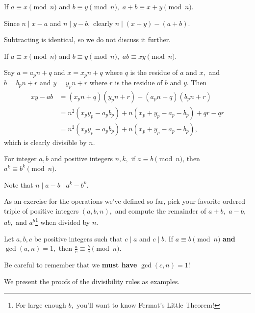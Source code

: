 \documentclass[blue,onecol]{shooting}
\begin{document}
\begin{fact}[Adding]
If $a \equiv x\pmod{n}$ and $b\equiv y\pmod{n},$ $a+b\equiv x+y\pmod{n}.$
\end{fact}

\begin{pro}
Since $n\mid x-a$ and $n\mid y-b,$ clearly $n\mid(x+y)-(a+b).$
\end{pro}

Subtracting is identical, so we do not discuss it further.

\begin{fact}[Multiplying]
If $a \equiv x\pmod{n}$ and $b\equiv y\pmod{n},$ $ab\equiv xy\pmod{n}.$
\end{fact}

\begin{pro}
Say $a=a_pn+q$ and $x=x_pn+q$ where $q$ is the residue of $a$ and $x,$ and $b=b_pn+r$ and $y=y_pn+r$ where $r$ is the residue of $b$ and $y.$ Then
\begin{align*}
xy-ab&=(x_pn+q)(y_pn+r)-(a_pn+q)(b_pn+r)\\
&=n^2(x_py_p-a_pb_p)+n(x_p+y_p-a_p-b_p)+qr-qr\\
&=n^2(x_py_p-a_pb_p)+n(x_p+y_p-a_p-b_p),
\end{align*}
which is clearly divisible by $n.$
\end{pro}

\begin{fact}[Exponentiating]
For integer $a,b$ and positive integers $n,k,$ if $a \equiv b\pmod{n}$, then $a^k \equiv b^k \pmod{n}$.
\end{fact}

\begin{pro}
Note that $n\mid a-b\mid a^k-b^k.$
\end{pro}

As an exercise for the operations we've defined so far, pick your favorite ordered triple of positive integers $(a,b,n),$ and compute the remainder of $a+b,$ $a-b,$ $ab,$ and $a^b$\footnote{For large enough $b,$ you'll want to know Fermat's Little Theorem!} when divided by $n.$

\begin{fact}[Dividing]
Let $a,b,c$ be positive integers such that $c\mid a$ and $c\mid b.$ If $a\equiv b\pmod{n}$ \textbf{and} $\gcd(a,n)=1,$ then $\frac{a}{c}\equiv\frac{b}{c}\pmod{n}.$
\end{fact}

Be careful to remember that we \textbf{must have} $\gcd(c,n)=1$!

We present the proofs of the divisibility rules as examples.
\end{document}
